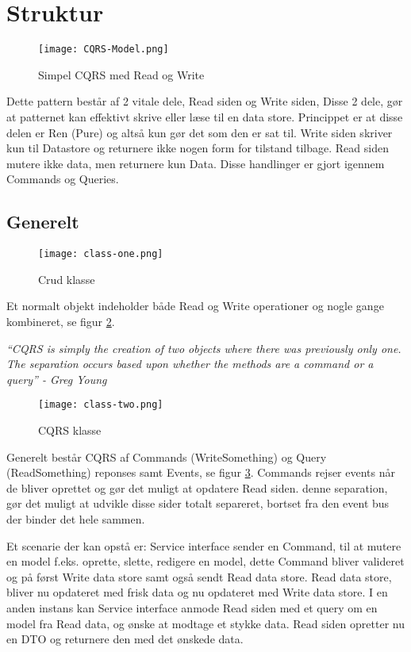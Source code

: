 \section{Struktur}

\begin{figure}[H]
	\center
	\texttt{[image: CQRS-Model.png]}
	\caption{Simpel CQRS med Read og Write}
	\label{fig:cqrs-model}
\end{figure}

Dette pattern består af 2 vitale dele, Read siden og Write siden, Disse 2 dele, gør at patternet kan effektivt skrive eller læse til en data store. Princippet er at disse delen er Ren (Pure) og altså kun gør det som den er sat til. Write siden skriver kun til Datastore og returnere ikke nogen form for tilstand tilbage. Read siden mutere ikke data, men returnere kun Data. Disse handlinger er gjort igennem Commands og Queries.

\subsection{Generelt}

\begin{figure}[H]
	\center
	\texttt{[image: class-one.png]}
	\caption{Crud klasse}
	\label{fig:class-one}
\end{figure}

Et normalt objekt indeholder både Read og Write operationer og nogle gange kombineret, se figur \ref{fig:class-one}.

\textit{``CQRS is simply the creation of two objects where there was previously only one. The separation occurs based upon whether the methods are a command or a query'' - Greg Young}

\begin{figure}[H]
	\center
	\texttt{[image: class-two.png]}
	\caption{CQRS klasse}
	\label{fig:class-two}
\end{figure}

Generelt består CQRS af Commands (WriteSomething) og Query (ReadSomething) reponses samt Events, se figur \ref{fig:class-two}. Commands rejser events når de bliver oprettet og gør det muligt at opdatere Read siden. denne separation, gør det muligt at udvikle disse sider totalt separeret, bortset fra den event bus der binder det hele sammen.

Et scenarie der kan opstå er: Service interface sender en Command, til at mutere en model f.eks. oprette, slette, redigere en model, dette Command bliver valideret og på først Write data store samt også sendt Read data store. Read data store, bliver nu opdateret med frisk data og nu opdateret med Write data store. I en anden instans kan Service interface anmode Read siden med et query om en model fra Read data, og ønske at modtage et stykke data. Read siden opretter nu en DTO og returnere den med det ønskede data. 
